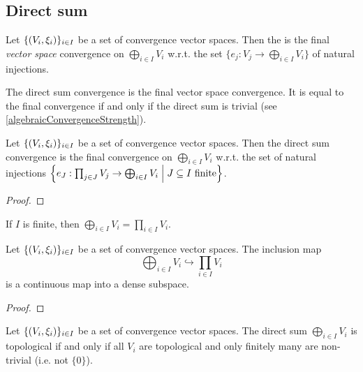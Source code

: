 \subsection{Direct sum}
\begin{definition}
Let $\{\left( V_i, \xi_i \right)\}_{i\in I}$ be a set of convergence vector spaces. Then the  is the final \emph{vector space} convergence on $\bigoplus_{i\in I}V_i$ w.r.t. the set $\{e_j: V_j \to \bigoplus_{i\in I}V_i\}$ of natural injections.
\end{definition}
The direct sum convergence is the final vector space convergence. It is equal to the final convergence if and only if the direct sum is trivial (see \ref{algebraicConvergenceStrength}).

\begin{proposition}
Let $\{\left( V_i, \xi_i \right)\}_{i\in I}$ be a set of convergence vector spaces. Then the direct sum convergence is the final convergence on $\bigoplus_{i\in I}V_i$ w.r.t. the set of natural injections $\setbuilder{e_J: \prod_{j\in J} V_j \to \bigoplus_{i\in I}V_i}{\text{$J\subseteq I$ finite}}$.
\end{proposition}
\begin{proof}

\end{proof}
\begin{corollary}
If $I$ is finite, then $\bigoplus_{i\in I}V_i = \prod_{i\in I}V_i$.
\end{corollary}

\begin{proposition}
Let $\{\left( V_i, \xi_i \right)\}_{i\in I}$ be a set of convergence vector spaces. The inclusion map
\[ \bigoplus_{i\in I}V_i \hookrightarrow \prod_{i\in I}V_i \]
is a continuous map into a dense subspace.
\end{proposition}
\begin{proof}

\end{proof}

\begin{proposition}
Let $\{\left( V_i, \xi_i \right)\}_{i\in I}$ be a set of convergence vector spaces. The direct sum $\bigoplus_{i\in I}V_i$ is topological \textup{if and only if} all $V_i$ are topological and only finitely many are non-trivial (i.e. not $\{0\}$).
\end{proposition}

